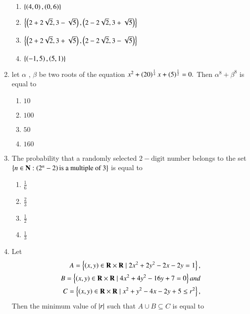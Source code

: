 \documentclass[journal]{IEEEtran}
\begin{document}
\begin{enumerate}[start=16]
    \begin{enumerate}
        \item $\left\{\left(4,0\right),{\left(0,6\right)}\right\}$
        \item $\left\{\left(2+2\sqrt{2},3-\sqrt{5}\right),{\left(2-2\sqrt{2},3+\sqrt{5}\right)}\right\}$
        \item $\left\{\left(2+2\sqrt{2},3+\sqrt{5}\right),{\left(2-2\sqrt{2},3-\sqrt{5}\right)}\right\}$
        \item $\left\{\left(-1,5\right),{\left(5,1\right)}\right\}$
    \end{enumerate}
\bigskip
\item let $\alpha$ , $\beta$ be two roots of the equation $x^{2} +\left(20\right)^{\frac{1}{4}}x+\left(5\right)^{\frac{1}{2}} = 0 .$ Then $\alpha^{8}+\beta^{8}$ is equal to
\begin{multicols}{4}
    \begin{enumerate}
        \item $10$
        \item $100$
        \item $50$
        \item $160$
    \end{enumerate}
\end{multicols}
\bigskip
\item The probability that a randomly selected $2-\text{digit}$ number belongs to the set $\left\{n \in \mathbf{N} : \left(2^{n} - 2\right) \text{is a multiple of } 3\right\}$ is equal to 
\begin{multicols}{4}
    \begin{enumerate}
        \item $\frac{1}{6}$
        \item $\frac{2}{3}$
        \item $\frac{1}{2}$
        \item $\frac{1}{3}$
    \end{enumerate}
\end{multicols}
\bigskip
\item Let 
\begin{align*}
    A = \left\{\left(x,y\right) \in \mathbf{R}\times\mathbf{R}\mid 2x^{2}+2y^{2}-2x-2y=1\right\},\\
    B = \left\{\left(x,y\right) \in \mathbf{R}\times\mathbf{R}\mid 4x^{2}+4y^{2}-16y+7=0\right\} and\\
    C = \left\{\left(x,y\right) \in \mathbf{R}\times\mathbf{R}\mid x^{2}+y^{2}-4x-2y+5\leq r^{2}\right\},
\end{align*}
Then the minimum value of $\left\vert r\right\vert$ such that $A \cup B \subseteq C$ is equal  to 
\begin{multicols}{2}

\end{multicols}
\end{enumerate}
\end{document}
